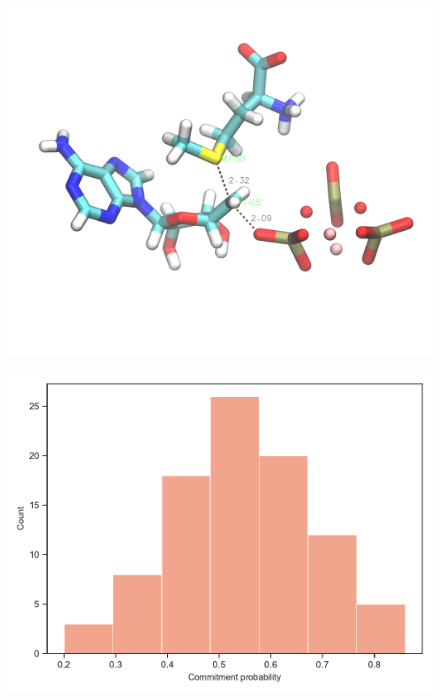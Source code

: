\documentclass[journal=jpcbfk,manuscript=article,layout=traditional]{achemso}
\begin{document}
\begin{figure}[ht!]
\includegraphics[scale=0.25]{figures/mat2a-transition-state.png}
\end{figure}

\begin{figure}[ht!]
\includegraphics[scale=0.5]{figures/comm-60-mat2a.pdf}
\end{figure}
\end{document}
